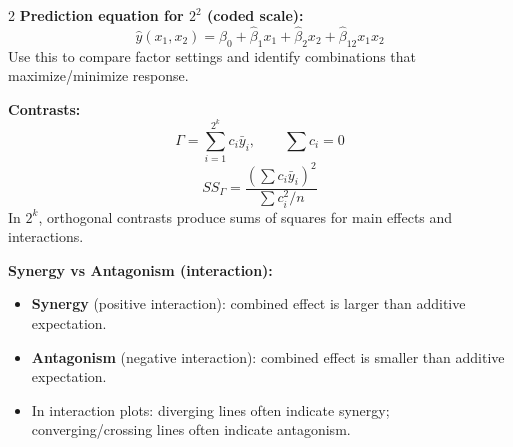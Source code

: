 \documentclass[10pt, letterpaper]{article}
\begin{document}
\begin{multicols}{2}
\textbf{Prediction equation for $2^2$ (coded scale):}
\[
\hat{y}(x_1,x_2)=\hat{\beta}_0+\hat{\beta}_1x_1+\hat{\beta}_2x_2+\hat{\beta}_{12}x_1x_2
\]
Use this to compare factor settings and identify combinations that maximize/minimize response.

\textbf{Contrasts:}
\[
\Gamma=\sum_{i=1}^{2^k} c_i\bar y_i,\qquad \sum c_i=0
\]
\[
SS_\Gamma=\frac{\left(\sum c_i\bar y_i\right)^2}{\sum c_i^2/n}
\]
In $2^k$, orthogonal contrasts produce sums of squares for main effects and interactions.

\textbf{Synergy vs Antagonism (interaction):}
\begin{itemize}
  \item \textbf{Synergy} (positive interaction): combined effect is larger than additive expectation.
  \item \textbf{Antagonism} (negative interaction): combined effect is smaller than additive expectation.
  \item In interaction plots: diverging lines often indicate synergy; converging/crossing lines often indicate antagonism.
\end{itemize}

\end{multicols}
\end{document}
